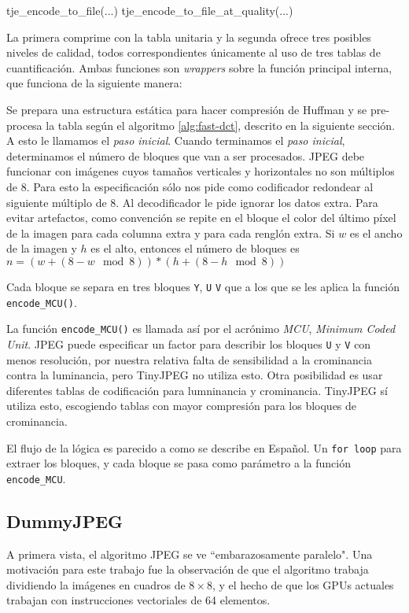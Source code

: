 \begin{code}[language=C][h]
tje_encode_to_file(...)
tje_encode_to_file_at_quality(...)
\end{code}

La primera comprime con la tabla unitaria y la segunda ofrece tres posibles
niveles de calidad, todos correspondientes únicamente al uso de tres tablas de
cuantificación. Ambas funciones son \emph{wrappers} sobre la función principal
interna, que funciona de la siguiente manera:

Se prepara una estructura estática para hacer compresión de Huffman y se
pre-procesa la tabla según el algoritmo \ref{alg:fast-dct}, descrito en la
siguiente sección. A esto le llamamos el \emph{paso inicial}.
Cuando terminamos el \emph{paso inicial}, determinamos el número de bloques que
van a ser procesados. JPEG debe funcionar con imágenes cuyos tamaños verticales
y horizontales no son múltiplos de 8. Para esto la especificación sólo nos pide
como codificador redondear al siguiente múltiplo de 8. Al decodificador le pide
ignorar los datos extra. Para evitar artefactos, como convención se repite en
el bloque el color del último píxel de la imagen para cada columna extra y para
cada renglón extra. Si $w$ es el ancho de la imagen y $h$ es el alto, entonces
el número de bloques es
$n = (w + (8 - w \mod 8)) * (h + (8 - h \mod 8))$

Cada bloque se separa en tres bloques \verb+Y+, \verb+U+ \verb+V+ que a los que
se les aplica la función \verb+encode_MCU()+.

La función \verb+encode_MCU()+ es llamada así por el acrónimo \emph{MCU},
\emph{Minimum Coded Unit}. JPEG puede especificar un factor para describir los
bloques \verb+U+ y \verb+V+ con menos resolución, por nuestra relativa falta de
sensibilidad a la crominancia contra la luminancia, pero TinyJPEG no utiliza
esto. Otra posibilidad es usar diferentes tablas de codificación para
lumninancia y crominancia. TinyJPEG sí utiliza esto, escogiendo tablas con
mayor compresión para los bloques de crominancia.

El flujo de la lógica es parecido a como se describe en Español.
Un \verb+for loop+ para extraer los bloques, y cada bloque se pasa como
parámetro a la función \verb+encode_MCU+.

\subsection{DummyJPEG} \label{sub:dummy}

A primera vista, el algoritmo JPEG se ve ``embarazosamente paralelo". Una
motivación para este trabajo fue la observación de que el algoritmo trabaja
dividiendo la imágenes en cuadros de $8\times8$, y el hecho de que los GPUs
actuales trabajan con instrucciones vectoriales de 64 elementos.

